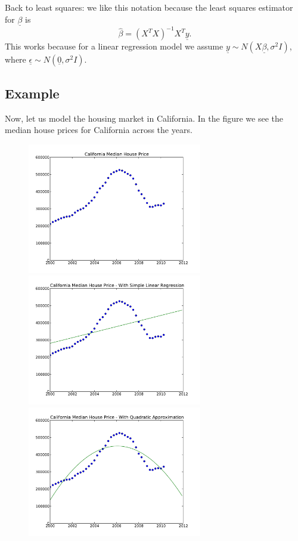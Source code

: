 Back to least squares: we like this notation because the least squares estimator for $\underline{\beta}$ is $$\hat{\beta} = (X^T X)^{-1} X^T \underline{y}.$$ This works because for a linear regression model we assume $\underline{y} \sim N(X\underline{\beta}, \sigma^2 I)$, where $\underline{\epsilon} \sim N(\underline{0}, \sigma^2 I)$.

\subsection*{Example}

Now, let us model the housing market in California. In the figure we see the median house prices for California across the years. 

\begin{figure}[h]
\centering
\includegraphics[width=3in]{california.pdf}
\includegraphics[width=3in]{cali-linear.pdf}
\includegraphics[width=3in]{cali-quadratic.pdf}
\end{figure}


